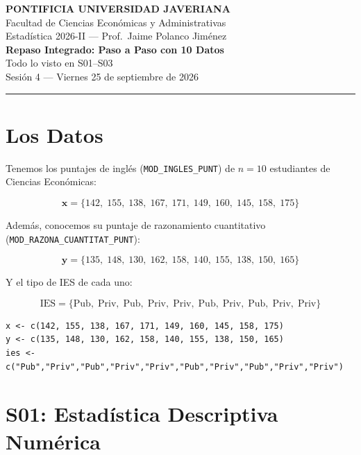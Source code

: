 \documentclass[11pt, a4paper]{article}
\begin{document}
\begin{center}
{\large\bfseries PONTIFICIA UNIVERSIDAD JAVERIANA}\\[3pt]
Facultad de Ciencias Econ\'omicas y Administrativas\\[2pt]
Estad\'istica 2026-II --- Prof.\ Jaime Polanco Jim\'enez\\[6pt]
{\LARGE\bfseries Repaso Integrado: Paso a Paso con 10 Datos}\\[3pt]
{\large Todo lo visto en S01--S03}\\[6pt]
Sesi\'on 4 --- Viernes 25 de septiembre de 2026
\end{center}

\vspace{4pt}
\rule{\linewidth}{0.5pt}

\section{Los Datos}

Tenemos los puntajes de ingl\'es (\texttt{MOD\_INGLES\_PUNT}) de $n = 10$ estudiantes
de Ciencias Econ\'omicas:

\[
\mathbf{x} = \{142,\; 155,\; 138,\; 167,\; 171,\; 149,\; 160,\; 145,\; 158,\; 175\}
\]

Adem\'as, conocemos su puntaje de razonamiento cuantitativo
(\texttt{MOD\_RAZONA\_CUANTITAT\_PUNT}):

\[
\mathbf{y} = \{135,\; 148,\; 130,\; 162,\; 158,\; 140,\; 155,\; 138,\; 150,\; 165\}
\]

Y el tipo de IES de cada uno:

\[
\text{IES} = \{\text{Pub},\; \text{Priv},\; \text{Pub},\; \text{Priv},\; \text{Priv},\;
\text{Pub},\; \text{Priv},\; \text{Pub},\; \text{Priv},\; \text{Priv}\}
\]

\begin{lstlisting}
x <- c(142, 155, 138, 167, 171, 149, 160, 145, 158, 175)
y <- c(135, 148, 130, 162, 158, 140, 155, 138, 150, 165)
ies <- c("Pub","Priv","Pub","Priv","Priv","Pub","Priv","Pub","Priv","Priv")
\end{lstlisting}

\section{S01: Estad\'istica Descriptiva Num\'erica}
\end{document}
